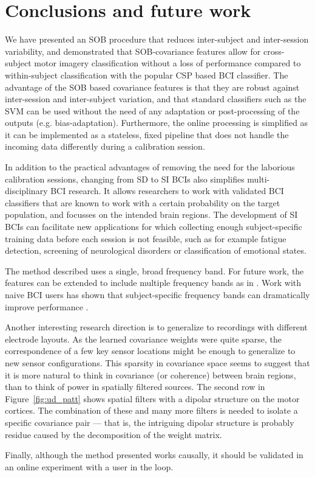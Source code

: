 \section{Conclusions and future work}
\begin{sloppypar}
We have presented an \ac{SOB} procedure that reduces inter-subject and
inter-session variability, and demonstrated that \ac{SOB}-covariance features
allow for cross-subject motor imagery classification without a loss of
performance compared to within-subject classification with the popular \ac{CSP}
based \ac{BCI} classifier.
%
The advantage of the \ac{SOB} based covariance features is that they are robust
against inter-session and inter-subject variation, and that standard
classifiers such as the \ac{SVM} can be used without the need of any adaptation
or post-processing of the outputs (e.g. bias-adaptation).
%
Furthermore, the online processing is simplified as it can be implemented as a
stateless, fixed pipeline that does not handle the incoming data differently
during a calibration session.

In addition to the practical advantages of removing the need for the laborious
calibration sessions, changing from \acl{SD} to \acl{SI} \acp{BCI} also
simplifies multi-disciplinary \ac{BCI} research. It allows researchers to work
with validated \ac{BCI} classifiers that are known to work with a certain
probability on the target population, and focusses on the intended brain
regions.
% 
The development of \acl{SI} \acp{BCI} can facilitate new applications for which
collecting enough subject-specific training data before each session is not
feasible, such as for example fatigue detection, screening of neurological
disorders or classification of emotional states.
\end{sloppypar}

The method described uses a single, broad frequency band. For future work, the
features can be extended to include multiple frequency bands as in
\cite{lotte2009cdt, farquhar2009lfs}. Work with naive \ac{BCI} users has shown that subject-specific frequency bands can dramatically improve performance \cite{blankertz2008bbc}.
 
\begin{sloppypar}
Another interesting research direction is to generalize to recordings with
different electrode layouts. As the learned covariance weights were quite
sparse, the correspondence of a few key sensor locations might be enough to
generalize to new sensor configurations. This sparsity in covariance space
seems to suggest that it is more natural to think in covariance (or coherence)
between brain regions, than to think of power in spatially filtered sources.
The second row in Figure~\ref{fig:ud_patt} shows spatial filters with a dipolar
structure on the motor cortices. The combination of these and many more filters
is needed to isolate a specific covariance pair --- that is, the intriguing
dipolar structure is probably residue caused by the decomposition of the weight
matrix.
\end{sloppypar}

Finally, although the method presented works causally, it should be validated in
an online experiment with a user in the loop.
